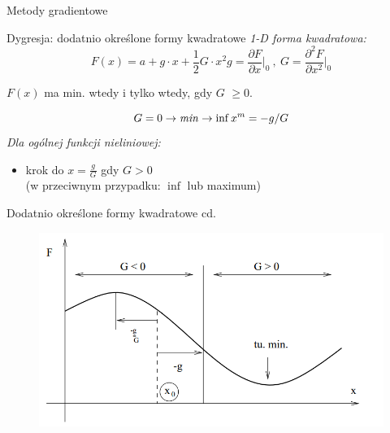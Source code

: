   \begin{frame}{Metody gradientowe}

    \begin{block}{Dygresja: dodatnio określone formy kwadratowe}
      \emph{1-D forma kwadratowa:}
	  \begin{displaymath}
	  		F(x) = a + g \cdot x + \frac{1}{2} G \cdot x^2
	  		g = \frac{\partial F}{\partial x} \bigg\vert_{0} \ , \ G = \frac{\partial^{2} F}{\partial x^2} \bigg\vert_{0}
	  \end{displaymath}
	  \begin{center}
	  		$F(x)$ ma min. wtedy i tylko wtedy, gdy $G$ $\geq 0$.
	  \end{center}
      \begin{displaymath}
	  		G = 0 \rightarrow \text{\emph{min}} \rightarrow \inf
	  		x^m = -g/G
	  \end{displaymath}
	  \emph{Dla ogólnej funkcji nieliniowej:}
	  \smallskip
	  \begin{itemize}
	  	    \item krok do $x = \frac{g}{G}$ gdy $G > 0$
	  	    \\(w przeciwnym przypadku: $\inf$ lub maximum)
	  \end{itemize}
	\end{block}

  \end{frame}

  \begin{frame}{Dodatnio określone formy kwadratowe cd.}

    \begin{figure}
		\centering
		\includegraphics[height=0.8\textheight ,width=1\textwidth]{img/17/dygresja}
	\end{figure}

  \end{frame}

